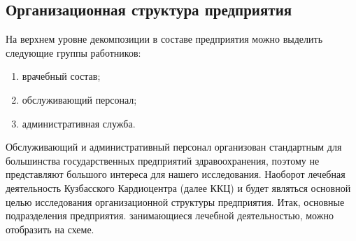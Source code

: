 \subsection{Организационная структура предприятия}
На верхнем уровне декомпозиции в составе предприятия можно выделить следующие
группы работников:

\begin{enumerate}
\item врачебный состав; 
\item обслуживающий персонал; 
\item административная служба.
\end{enumerate}

Обслуживающий и административный персонал организован стандартным для
большинства государственных предприятий здравоохранения, поэтому не представляют
большого интереса для нашего исследования.
Наоборот лечебная деятельность Кузбасского Кардиоцентра (далее ККЦ) и будет
являться основной целью исследования организационной структуры предприятия.
Итак, основные подразделения предприятия. занимающиеся лечебной деятельностью,
можно отобразить на схеме.
